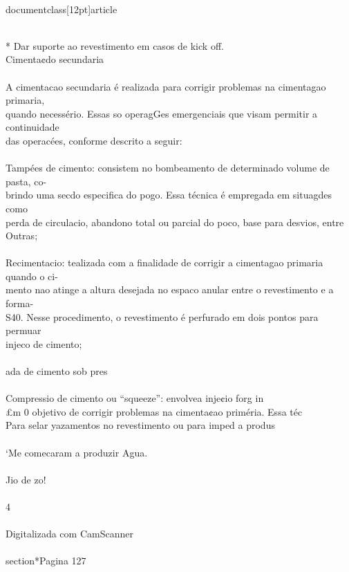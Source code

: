 \\documentclass[12pt]{article}
\begin{document}
\\
* Dar suporte ao revestimento em casos de kick off.\\
Cimenta¢do secundaria\\
\\
A cimentacao secundaria é realizada para corrigir problemas na cimentagao primaria,\\
quando necessério. Essas so operagGes emergenciais que visam permitir a continuidade\\
das operacées, conforme descrito a seguir:\\
\\
Tampées de cimento: consistem no bombeamento de determinado volume de pasta, co-\\
brindo uma secdo especifica do pogo. Essa técnica é empregada em situagdes como\\
perda de circulacio, abandono total ou parcial do poco, base para desvios, entre\\
Outras;\\
\\
Recimentacio: tealizada com a finalidade de corrigir a cimentagao primaria quando o ci-\\
mento nao atinge a altura desejada no espaco anular entre o revestimento e a forma-\\
S40. Nesse procedimento, o revestimento é perfurado em dois pontos para permuar\\
injeco de cimento;\\
\\
ada de cimento sob pres\\
\\
Compressio de cimento ou “squeeze”: envolvea inje¢io forg in\\
£m 0 objetivo de corrigir problemas na cimenta¢ao priméria. Essa téc\\
Para selar yazamentos no revestimento ou para imped a produs\\
\\
‘Me comecaram a produzir Agua.\\
\\
Jio de zo!\\
\\
4\\
\\
Digitalizada com CamScanner\\

\\section*{Pagina 127}
\end{document}
